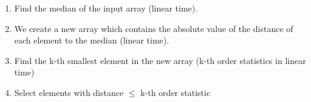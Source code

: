 \begin{enumerate}
	\item Find the median of the input array (linear time).
	\item We create a new array which contains the absolute value of the distance of each element to the median (linear time).
	\item Find the k-th smallest element in the new array (k-th order statistics in linear time)
	\item Select elements with distance $\leq$ k-th order statistic
\end{enumerate}